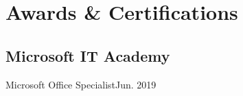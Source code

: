 \section{Awards \& Certifications}
\subsection{Microsoft IT Academy}{Microsoft Office Specialist}{}{Jun. 2019}